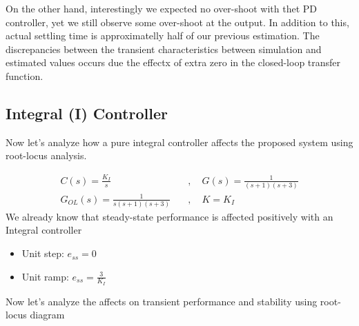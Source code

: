 \documentclass[twoside]{article}
\begin{document}
On the other hand, interestingly we expected no over-shoot with
thet PD controller, yet we still observe some over-shoot 
at the output. In addition to this, actual settling 
time is approximatelly half of our previous estimation. 
The discrepancies between the transient characteristics between
simulation and estimated values occurs due the
effectx of extra zero in the closed-loop transfer function. 

\subsection{Integral (I) Controller}

Now let's analyze how a pure integral controller affects 
the proposed system using root-locus analysis. 

%
\begin{align*}
 C(s) = \frac{K_I}{s} \quad &, \quad G(s) = \frac{1}{(s+1) (s+3)}
\\
G_{OL}(s) = \frac{1}{s (s+1) (s+3)} \quad &, \quad K = K_I
\end{align*}
%
We already know that steady-state performance is affected
positively with an Integral controller
%
\begin{itemize}
\item Unit step: $e_{ss} = 0$
\item Unit ramp: $e_{ss} = \frac{3}{K_I}$
\end{itemize}
Now let's analyze the affects on transient performance
and stability using root-locus diagram
%
\vspace{12pt}
\end{document}
